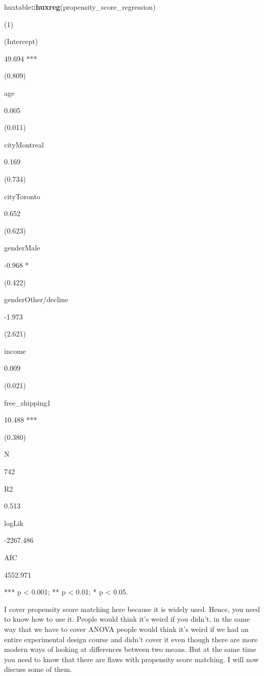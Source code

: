 \documentclass[
]{book}
\newenvironment{Shaded}{\begin{snugshade}}{\end{snugshade}}
\newcommand{\KeywordTok}[1]{\textcolor[rgb]{0.13,0.29,0.53}{\textbf{#1}}}
\newcommand{\NormalTok}[1]{#1}
\newcommand{\OperatorTok}[1]{\textcolor[rgb]{0.81,0.36,0.00}{\textbf{#1}}}
\begin{document}
\begin{Shaded}
\begin{Highlighting}[]
\NormalTok{huxtable}\OperatorTok{::}\KeywordTok{huxreg}\NormalTok{(propensity_score_regression)}
\end{Highlighting}
\end{Shaded}

\label{tab:unnamed-chunk-377}

(1)

(Intercept)

49.694 ***

(0.809)~~~

age

0.005~~~~

(0.011)~~~

cityMontreal

0.169~~~~

(0.734)~~~

cityToronto

0.652~~~~

(0.623)~~~

genderMale

-0.968 *~~

(0.422)~~~

genderOther/decline

-1.973~~~~

(2.621)~~~

income

0.009~~~~

(0.021)~~~

free\_shipping1

10.488 ***

(0.380)~~~

N

742~~~~~~~~

R2

0.513~~~~

logLik

-2267.486~~~~

AIC

4552.971~~~~

*** p \textless{} 0.001; ** p \textless{} 0.01; * p \textless{} 0.05.

I cover propensity score matching here because it is widely used. Hence, you need to know how to use it. People would think it's weird if you didn't, in the same way that we have to cover ANOVA people would think it's weird if we had an entire experimental design course and didn't cover it even though there are more modern ways of looking at differences between two means. But at the same time you need to know that there are flaws with propensity score matching. I will now discuss some of them.
\end{document}
